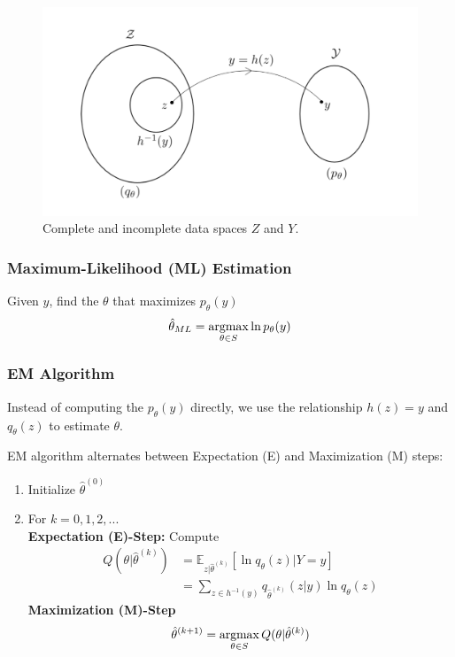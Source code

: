 \documentclass[11pt,a4paper]{article}
\newcommand{\argmax}{\operatornamewithlimits{argmax}}
\begin{document}
\begin{center}\begin{figure}[htbp]
    \centering
    \includegraphics[scale=0.2]{EM1.png}
    \caption{Complete and incomplete data spaces $Z$ and $Y$.}
    \label{}
\end{figure}\end{center}

\subsubsection*{Maximum-Likelihood (ML) Estimation}
Given $y$, find the $\theta$ that maximizes $p_\theta(y)$
$$\hat{\theta}_{ML}=\argmax_{\theta\in S}\ln p_\theta(y)$$
\subsubsection*{EM Algorithm}
Instead of computing the $p_\theta(y)$ directly, we use the relationship $h(z)=y$ and $q_\theta(z)$ to estimate $\theta$.

EM algorithm alternates between Expectation (E) and Maximization (M) steps:
\begin{enumerate}
    \item Initialize $\hat{\theta}^{(0)}$
    \item For $k=0,1,2,...$\\
    \textbf{Expectation (E)-Step:}
        Compute
        \begin{equation}
            \begin{aligned}
                Q(\theta|\hat{\theta}^{(k)})
                &=\mathbb{E}_{z|\hat{\theta}^{(k)}}[\ln q_\theta(z)|Y=y]\\
                &=\sum_{z\in h^{-1}(y)}q_{\hat{\theta}^{(k)}}(z|y)\ln q_\theta(z)
            \end{aligned}
            \nonumber
        \end{equation}
    \textbf{Maximization (M)-Step} $$\hat{\theta}^{(k+1)}=\argmax_{\theta\in S}Q(\theta|\hat{\theta}^{(k)})$$
\end{enumerate}
\end{document}
